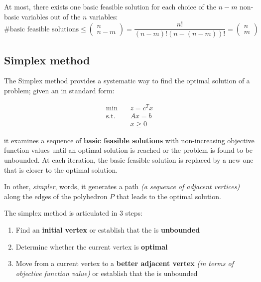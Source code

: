 \documentclass[english]{article}
\begin{document}
\begin{property}
  At most, there exists one basic feasible solution for each choice of the \(n-m\) non-basic variables out of the \(n\) variables:
  \[\text{\# basic feasible solutions} \leq
    \begin{pmatrix}
      n \\ n-m
    \end{pmatrix}
    = \dfrac{n!}{\left( n - m \right)! \left( n - \left( n-m \right) \right)!} =
    \begin{pmatrix}
      n \\ m
    \end{pmatrix}
  \]
\end{property}

\subsection{Simplex method}

The Simplex method provides a systematic way to find the optimal solution of a \LP problem;
given an \LP in standard form:

\begin{align*}
  \min \quad        & z = c^T x \\
  \text{s.t.} \quad & Ax = b    \\
                    & x \geq 0
\end{align*}

it examines a sequence of \textbf{basic feasible solutions} with non-increasing objective function values until an optimal solution is reached or the problem is found to be unbounded.
At each iteration, the basic feasible solution is replaced by a new one that is closer to the optimal solution.

In other, \textit{simpler}, words, it generates a path \textit{(a sequence of adjacent vertices)} along the edges of the polyhedron \(P\) that leads to the optimal solution.

\bigskip
The simplex method is articulated in \(3\) steps:

\begin{enumerate}[label=\arabic*., ref=(\arabic*)]
  \item Find an \textbf{initial vertex} or establish that the \LP is \textbf{unbounded}
  \item Determine whether the current vertex is \textbf{optimal}
  \item \label{enum:simplex-method-3} Move from a current vertex to a \textbf{better adjacent vertex} \textit{(in terms of objective function value)} or establish that the \LP is unbounded
\end{enumerate}
\end{document}
